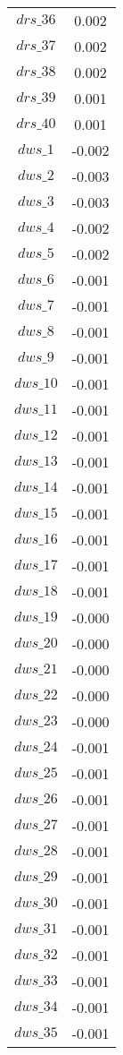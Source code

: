 \begin{center}
\begin{longtable}{cc}
$drs\_36$ 	 & 	 0.002 \\
$drs\_37$ 	 & 	 0.002 \\
$drs\_38$ 	 & 	 0.002 \\
$drs\_39$ 	 & 	 0.001 \\
$drs\_40$ 	 & 	 0.001 \\
$dws\_1$ 	 & 	 -0.002 \\
$dws\_2$ 	 & 	 -0.003 \\
$dws\_3$ 	 & 	 -0.003 \\
$dws\_4$ 	 & 	 -0.002 \\
$dws\_5$ 	 & 	 -0.002 \\
$dws\_6$ 	 & 	 -0.001 \\
$dws\_7$ 	 & 	 -0.001 \\
$dws\_8$ 	 & 	 -0.001 \\
$dws\_9$ 	 & 	 -0.001 \\
$dws\_10$ 	 & 	 -0.001 \\
$dws\_11$ 	 & 	 -0.001 \\
$dws\_12$ 	 & 	 -0.001 \\
$dws\_13$ 	 & 	 -0.001 \\
$dws\_14$ 	 & 	 -0.001 \\
$dws\_15$ 	 & 	 -0.001 \\
$dws\_16$ 	 & 	 -0.001 \\
$dws\_17$ 	 & 	 -0.001 \\
$dws\_18$ 	 & 	 -0.001 \\
$dws\_19$ 	 & 	 -0.000 \\
$dws\_20$ 	 & 	 -0.000 \\
$dws\_21$ 	 & 	 -0.000 \\
$dws\_22$ 	 & 	 -0.000 \\
$dws\_23$ 	 & 	 -0.000 \\
$dws\_24$ 	 & 	 -0.001 \\
$dws\_25$ 	 & 	 -0.001 \\
$dws\_26$ 	 & 	 -0.001 \\
$dws\_27$ 	 & 	 -0.001 \\
$dws\_28$ 	 & 	 -0.001 \\
$dws\_29$ 	 & 	 -0.001 \\
$dws\_30$ 	 & 	 -0.001 \\
$dws\_31$ 	 & 	 -0.001 \\
$dws\_32$ 	 & 	 -0.001 \\
$dws\_33$ 	 & 	 -0.001 \\
$dws\_34$ 	 & 	 -0.001 \\
$dws\_35$ 	 & 	 -0.001 \\

\end{longtable}
\end{center}
